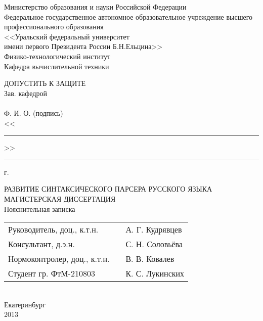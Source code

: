 \thispagestyle{empty}
\begin{center}
Министерство образования и науки  Российской Федерации\\
Федеральное государственное автономное образовательное учреждение 
высшего профессионального образования\\
<<Уральский  федеральный университет\\ имени первого Президента России Б.Н.Ельцина>>\\
Физико-технологический институт\\
Кафедра вычислительной техники\\
\end{center}

\vspace{1cm}

\begin{flushright}
		\begin{minipage}{0.50\textwidth}
			\begin{flushleft}
				ДОПУСТИТЬ К ЗАЩИТЕ\\
				Зав. кафедрой \hrulefill\\
				\hrulefill \space \hrulefill\\
				{\small Ф. И. О.} \hspace{3cm} {\small (подпись)}\\
				<<\rule{1.5cm}{0.2mm}>> \hrulefill {}\rule{1cm}{0.2mm} г.\\
			\end{flushleft}
		\end{minipage}
\end{flushright}

\vspace{1cm}

\begin{center}
{\large РАЗВИТИЕ СИНТАКСИЧЕСКОГО ПАРСЕРА РУССКОГО ЯЗЫКА}\\
\vspace{1cm}
МАГИСТЕРСКАЯ ДИССЕРТАЦИЯ\\
Пояснительная записка\\
\vspace{3cm}
	\begin{tabular}{ l c l}
		Руководитель, доц., к.т.н. & \HRule & А. Г. Кудрявцев\\
		Консультант, д.э.н. & \HRule & С. Н. Соловьёва\\
		Нормоконтролер, доц., к.т.н. & \HRule & В. В. Ковалев\\
		Студент гр. ФтМ-210803 & \HRule & К. С. Лукинских\\		
	\end{tabular}\\
\vspace{3cm}
Екатеринбург\\
2013
\end{center}
